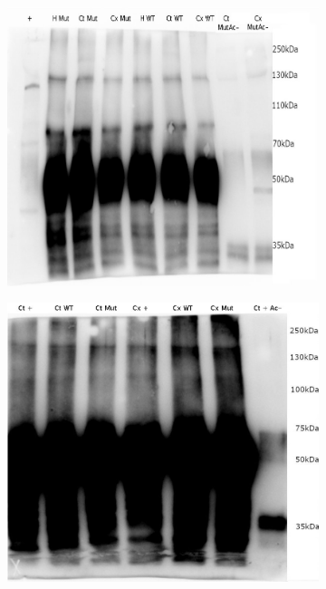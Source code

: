 \begin{figure}[h]
\begin{center}
\begin{subfigure}[h]{0.49\textwidth}
			\end{subfigure}
			\begin{subfigure}[h]{0.49\textwidth}
				\caption{}
				\label{fig:WB1erechec}
				\includegraphics[width=\textwidth]{./Images/WB/2018-04-19.jpg} %
			\end{subfigure}
			\begin{subfigure}[h]{0.49\textwidth}
				\caption{}
				\label{fig:WBpasbon}
				\includegraphics[width=\textwidth]{./Images/WB/2018-05-03.jpg} %

\end{subfigure}
\end{center}
\end{figure}
